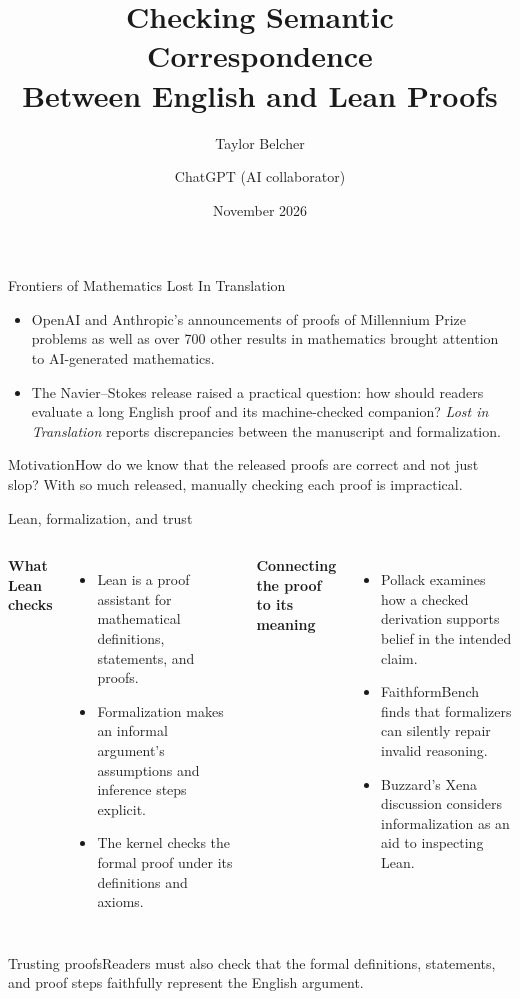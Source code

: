 \documentclass[aspectratio=169,11pt]{beamer}
\title{Checking Semantic Correspondence\\Between English and Lean Proofs}
\author{Taylor Belcher \and ChatGPT (AI collaborator)}
\institute{CSCE883: Machine Learning}
\date{November 2026}
\begin{document}
{
\begin{frame}\titlepage\end{frame}}
\begin{frame}{Frontiers of Mathematics Lost In Translation}
\begin{itemize}
\item OpenAI and Anthropic's announcements of proofs of Millennium Prize problems as well as over 700 other results in mathematics brought attention to AI-generated mathematics.
\item The Navier--Stokes release raised a practical question: how should readers evaluate a long English proof and its machine-checked companion? \emph{Lost in Translation} reports discrepancies between the manuscript and formalization.
\end{itemize}
\begin{block}{Motivation}How do we know that the released proofs are correct and not just slop? With so much released, manually checking each proof is impractical.\end{block}
\end{frame}
\begin{frame}{Lean, formalization, and trust}
\begin{columns}[T]
\textbf{What Lean checks}
\begin{itemize}
\item Lean is a proof assistant for mathematical definitions, statements, and proofs.
\item Formalization makes an informal argument's assumptions and inference steps explicit.
\item The kernel checks the formal proof under its definitions and axioms.
\end{itemize}
\textbf{Connecting the proof to its meaning}
\begin{itemize}
\item Pollack examines how a checked derivation supports belief in the intended claim.
\item FaithformBench finds that formalizers can silently repair invalid reasoning.
\item Buzzard's Xena discussion considers informalization as an aid to inspecting Lean.
\end{itemize}
\end{columns}
\begin{block}{Trusting proofs}Readers must also check that the formal definitions, statements, and proof steps faithfully represent the English argument.\end{block}
\end{frame}
\end{document}
